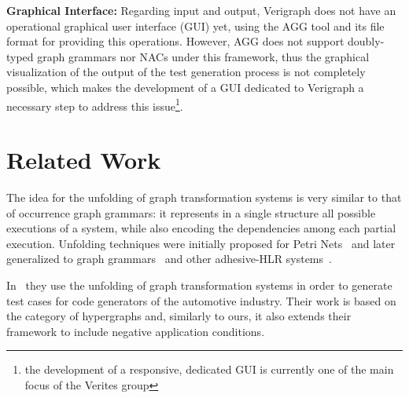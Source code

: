 \textbf{Graphical Interface:} Regarding input and output, Verigraph does not have an operational graphical user interface (GUI) yet, using the AGG tool and its  file format for providing this operations. However, AGG does not support doubly-typed graph grammars nor NACs under this framework, thus the graphical visualization of the output of the test generation process is not completely possible, which makes the development of a GUI dedicated to Verigraph a necessary step to address this issue\footnote{the development
  of a responsive, dedicated GUI is currently one of the main focus of the Verites group}.





\section{Related Work}

  The idea for the unfolding of graph transformation systems is very similar to that of occurrence graph grammars: it represents in a single structure all possible executions of a system, while also encoding the dependencies among each partial execution.
  Unfolding techniques were initially proposed for Petri Nets~\cite{unk} and later generalized to graph grammars~\cite{Ribeiro1996} and other adhesive-HLR systems~\cite{unk}.

  In~\cite{Baldan2004} they use the unfolding of graph transformation systems in order to generate test cases for code generators of the automotive industry.
  Their work is based on the category of hypergraphs and, similarly to ours, it also extends their framework to include negative application conditions.

